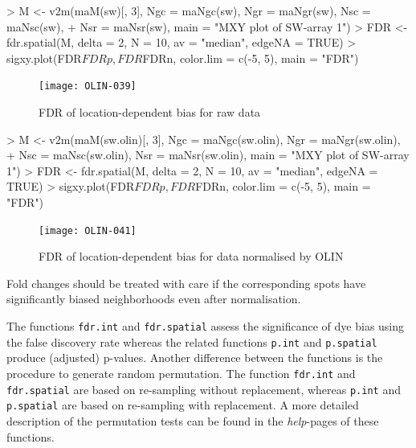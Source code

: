 \documentclass[a4paper,11pt]{article}
\begin{document}

\begin{Schunk}
\begin{Sinput}
> M <- v2m(maM(sw)[, 3], Ngc = maNgc(sw), Ngr = maNgr(sw), Nsc = maNsc(sw), 
+     Nsr = maNsr(sw), main = "MXY plot of SW-array 1")
> FDR <- fdr.spatial(M, delta = 2, N = 10, av = "median", edgeNA = TRUE)
> sigxy.plot(FDR$FDRp, FDR$FDRn, color.lim = c(-5, 5), main = "FDR")
\end{Sinput}
\end{Schunk}




\begin{figure}[t]
\centering
\texttt{[image: OLIN-039]}
\caption{FDR of location-dependent bias for raw data }
\label{fdrspatialraw}
\end{figure}


\begin{Schunk}
\begin{Sinput}
> M <- v2m(maM(sw.olin)[, 3], Ngc = maNgc(sw.olin), Ngr = maNgr(sw.olin), 
+     Nsc = maNsc(sw.olin), Nsr = maNsr(sw.olin), main = "MXY plot of SW-array 1")
> FDR <- fdr.spatial(M, delta = 2, N = 10, av = "median", edgeNA = TRUE)
> sigxy.plot(FDR$FDRp, FDR$FDRn, color.lim = c(-5, 5), main = "FDR")
\end{Sinput}
\end{Schunk}


\begin{figure}
\centering
\texttt{[image: OLIN-041]}
\caption{FDR of location-dependent bias for data normalised by OLIN}
\label{fdrspatialolin}
\end{figure}


 
Fold changes should be treated with care if the corresponding spots have significantly biased 
neighborhoods even after normalisation. 


The functions \texttt{fdr.int} and \texttt{fdr.spatial} assess the significance of dye bias using the false discovery
rate whereas the related  functions \texttt{p.int} and \texttt{p.spatial} produce (adjusted) p-values.
Another difference between the functions is the procedure to generate random permutation.
The function \texttt{fdr.int} and \texttt{fdr.spatial} are based on re-sampling without replacement,
whereas  \texttt{p.int} and \texttt{p.spatial} are based on re-sampling with replacement.  
A more detailed description of the permutation tests can be found in the \textit{help}-pages of these functions.
\end{document}
